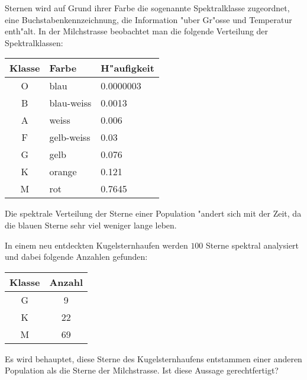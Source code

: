 Sternen wird auf Grund ihrer Farbe die sogenannte Spektralklasse zugeordnet,
eine Buchstabenkennzeichnung, die Information "uber Gr"osse und Temperatur
enth"alt.
In der Milchstrasse beobachtet man die folgende Verteilung
der Spektralklassen:
\begin{center}
\begin{tabular}{|c|l|l|}
\hline
Klasse&Farbe     &H"aufigkeit\\
\hline
O     &blau      &0.0000003\\
B     &blau-weiss&0.0013\\
A     &weiss     &0.006\\
F     &gelb-weiss&0.03\\
G     &gelb      &0.076\\
K     &orange    &0.121\\
M     &rot       &0.7645\\
\hline
\end{tabular}
\end{center}
Die spektrale Verteilung der Sterne einer Population "andert sich mit der
Zeit, da die blauen Sterne sehr viel weniger lange leben.

In einem neu entdeckten Kugelsternhaufen werden $100$ Sterne spektral
analysiert und dabei folgende Anzahlen gefunden:
\begin{center}
\begin{tabular}{|c|c|}
\hline
Klasse&Anzahl\\
\hline
G&9\\
K&22\\
M&69\\
\hline
\end{tabular}
\end{center}
Es wird behauptet, diese Sterne des Kugelsternhaufens entstammen einer
anderen Population als die Sterne der Milchstrasse.
Ist diese Aussage gerechtfertigt?

